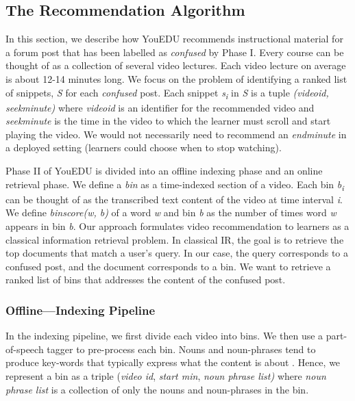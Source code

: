 \documentclass{edm_template}
\begin{document}
\subsection{The Recommendation Algorithm}
\vspace{1mm}
In this section, we describe how YouEDU recommends instructional material for a forum post that
has been labelled as \textit{confused} by Phase I. Every course can be thought of as a collection of several video lectures. Each video lecture on average is about 12-14 minutes long. We focus on the problem of identifying a ranked list of snippets, \textit{S} for each \textit{confused} post. Each snippet \textit{s\textsubscript i} in \textit{S} is a tuple \textit{(video\textunderscore id, seek\textunderscore minute)} where \textit{video\textunderscore id} is an identifier for the recommended video and \textit{seek\textunderscore minute} is the time in the video to which the learner must scroll and start playing the video. We would not necessarily need to recommend an \textit{end\textunderscore minute} in a deployed setting (learners could choose when to stop watching).

Phase II of YouEDU is divided into an offline indexing phase and an online retrieval phase.
We define a \textit {bin} as a time-indexed section of a video. Each bin \textit{b\textsubscript{i}} can be thought of as the transcribed text content of the video
at time interval \textit{i}. We define \textit{binscore(w, b)} of a word \textit{w} and bin \textit{b} as the number of times word \textit{w} appears in bin \textit{b}. Our approach formulates video recommendation to learners as a classical information retrieval problem. In classical IR, the goal is to retrieve the top documents that match a user's query. In our case, the query corresponds to a confused post, and the document corresponds to a bin. We want to retrieve a ranked list of bins that addresses the content of the confused post.

\subsubsection{Offline---Indexing Pipeline}
In the indexing pipeline, we first divide each video into bins. We then use a part-of-speech tagger \cite{nltk} to pre-process each bin. Nouns and noun-phrases tend to produce key-words that typically express what the content is about \cite{hulth2003improved}. Hence, we represent a bin as a triple (\textit{video \textunderscore id}, \textit{start \textunderscore min}, \textit{noun \textunderscore phrase \textunderscore list)} where \textit{noun \textunderscore phrase \textunderscore list} is a collection of only the nouns and noun-phrases in the bin.
\end{document}
